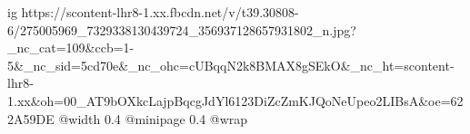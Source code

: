  
 
 
 
 

\ifcmt
  ig https://scontent-lhr8-1.xx.fbcdn.net/v/t39.30808-6/275005969_7329338130439724_356937128657931802_n.jpg?_nc_cat=109&ccb=1-5&_nc_sid=5cd70e&_nc_ohc=cUBqqN2k8BMAX8gSEkO&_nc_ht=scontent-lhr8-1.xx&oh=00_AT9bOXkcLajpBqcgJdYl6123DiZcZmKJQoNeUpeo2LIBsA&oe=622A59DE
  @width 0.4
  @minipage 0.4
  @wrap \parpic[r]
\fi
